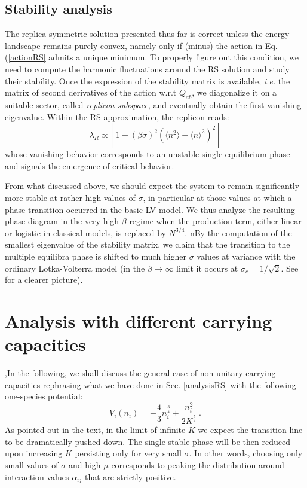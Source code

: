 \documentclass[12pt]{article}
\begin{document}
\subsection{Stability analysis}

The replica symmetric solution presented thus far is correct unless the energy landscape remains purely convex, namely only if (minus) the action in Eq. (\ref{actionRS} admits a unique minimum. To properly figure out this condition, we need to compute the harmonic fluctuations around the RS solution and study their stability. Once the expression of the stability matrix is available, \emph{i.e.} the matrix of second derivatives of the action w.r.t $Q_{ab}$, we diagonalize it on a suitable sector, called \emph{replicon subspace}, and eventually obtain the first vanishing eigenvalue. 
Within the RS approximation, the replicon reads:
\begin{equation}
\lambda_R \propto \left[ 1-(\beta \sigma)^2 \overline {\left( \langle n^2 \rangle -\langle n \rangle^2 \right)^2} \right]
\end{equation}
whose vanishing behavior corresponds to an unstable single equilibrium phase and signals the emergence of critical behavior.

From what discussed above, we should expect the system to remain significantly more stable at rather high values of $\sigma$, in particular at those values at which a phase transition occurred in the basic LV model. We thus analyze the resulting phase diagram in the very high $\beta$ regime when the production term, either linear or logistic in classical models, is replaced by $N^{3/4}$. 
nBy the computation of the smallest eigenvalue of the stability matrix, we claim that the transition to the multiple equilibra phase is shifted to much higher $\sigma$ values at variance with the ordinary Lotka-Volterra model (in the $\beta \rightarrow \infty$ limit it occurs at $\sigma_c=1/\sqrt{2}$. See \cite{Biroli2018, Altieri_PRL2021} for a clearer picture).


\section{Analysis with different carrying capacities}

,In the following, we shall discuss the general case of non-unitary carrying capacities rephrasing what we have done in Sec. \ref{analysisRS} with the following one-species potential:
\begin{equation}
  V_i(n_i)= -\frac{4}{3} n_i^{\frac{3}{4}} +\frac{n_i^2}{2 K^{\frac{5}{4}}} \ .
\end{equation}
As pointed out in the text, in the limit of infinite $K$ we expect the transition line to be dramatically pushed down. The single stable phase will be then reduced upon increasing $K$ persisting only for very small $\sigma$.
In other words, choosing only small values of $\sigma$ and high $\mu$ corresponds to peaking the distribution around interaction values $\alpha_{ij}$ that are strictly positive. 
\end{document}
